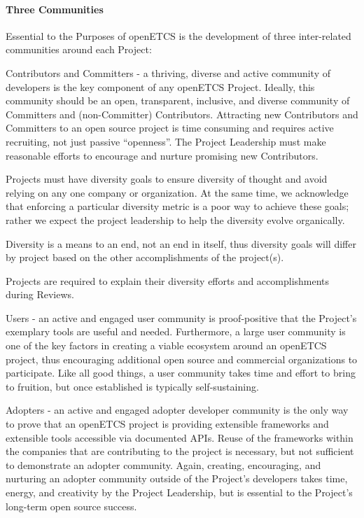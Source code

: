 \documentclass{template/openetcs_article}
\begin{document}
\paragraph{Three Communities}
Essential to the Purposes of openETCS is the development of three inter-related communities around each Project:

Contributors and Committers - a thriving, diverse and active community of developers is the key component of any openETCS Project. Ideally, this community should be an open, transparent, inclusive, and diverse community of Committers and (non-Committer) Contributors. Attracting new Contributors and Committers to an open source project is time consuming and requires active recruiting, not just passive ``openness''. The Project Leadership must make reasonable efforts to encourage and nurture promising new Contributors.

Projects must have diversity goals to ensure diversity of thought and avoid relying on any one company or organization. At the same time, we acknowledge that enforcing a particular diversity metric is a poor way to achieve these goals; rather we expect the project leadership to help the diversity evolve organically.

Diversity is a means to an end, not an end in itself, thus diversity goals will differ by project based on the other accomplishments of the project(s).

Projects are required to explain their diversity efforts and accomplishments during Reviews.

Users - an active and engaged user community is proof-positive that the Project's exemplary tools are useful and needed. Furthermore, a large user community is one of the key factors in creating a viable ecosystem around an openETCS project, thus encouraging additional open source and commercial organizations to participate. Like all good things, a user community takes time and effort to bring to fruition, but once established is typically self-sustaining.

Adopters - an active and engaged adopter developer community is the only way to prove that an openETCS project is providing extensible frameworks and extensible tools accessible via documented APIs. Reuse of the frameworks within the companies that are contributing to the project is necessary, but not sufficient to demonstrate an adopter community. Again, creating, encouraging, and nurturing an adopter community outside of the Project's developers takes time, energy, and creativity by the Project Leadership, but is essential to the Project's long-term open source success.
\end{document}
